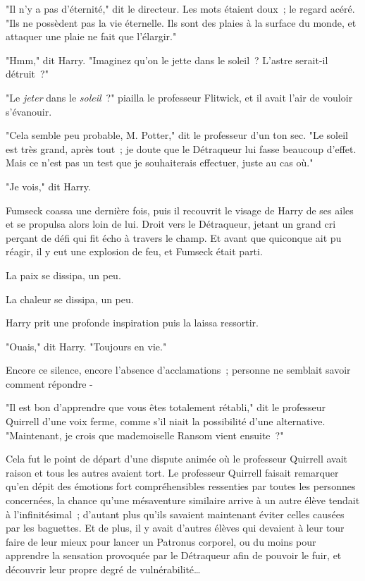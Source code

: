 "Il n'y a pas d'éternité," dit le directeur. Les mots étaient doux~; le regard acéré. "Ils ne possèdent pas la vie éternelle. Ils sont des plaies à la surface du monde, et attaquer une plaie ne fait que l'élargir."

"Hmm," dit Harry. "Imaginez qu'on le jette dans le soleil~? L'astre serait-il détruit~?"

"Le \emph{jeter} dans le \emph{soleil}~?" piailla le professeur Flitwick, et il avait l'air de vouloir s'évanouir.

"Cela semble peu probable, M. Potter," dit le professeur d'un ton sec. "Le soleil est très grand, après tout~; je doute que le Détraqueur lui fasse beaucoup d'effet. Mais ce n'est pas un test que je souhaiterais effectuer, juste au cas où."

"Je vois," dit Harry.

Fumseck coassa une dernière fois, puis il recouvrit le visage de Harry de ses ailes et se propulsa alors loin de lui. Droit vers le Détraqueur, jetant un grand cri perçant de défi qui fit écho à travers le champ. Et avant que quiconque ait pu réagir, il y eut une explosion de feu, et Fumseck était parti.

La paix se dissipa, un peu.

La chaleur se dissipa, un peu.

Harry prit une profonde inspiration puis la laissa ressortir.

"Ouais," dit Harry. "Toujours en vie."

Encore ce silence, encore l'absence d'acclamations~; personne ne semblait savoir comment répondre -

"Il est bon d'apprendre que vous êtes totalement rétabli," dit le professeur Quirrell d'une voix ferme, comme s'il niait la possibilité d'une alternative. "Maintenant, je crois que mademoiselle Ransom vient ensuite~?"

Cela fut le point de départ d'une dispute animée où le professeur Quirrell avait raison et tous les autres avaient tort. Le professeur Quirrell faisait remarquer qu'en dépit des émotions fort compréhensibles ressenties par toutes les personnes concernées, la chance qu'une mésaventure similaire arrive à un autre élève tendait à l'infinitésimal~; d'autant plus qu'ils savaient maintenant éviter celles causées par les baguettes. Et de plus, il y avait d'autres élèves qui devaient à leur tour faire de leur mieux pour lancer un Patronus corporel, ou du moins pour apprendre la sensation provoquée par le Détraqueur afin de pouvoir le fuir, et découvrir leur propre degré de vulnérabilité…


